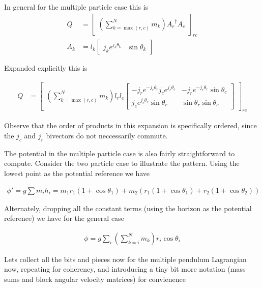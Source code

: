 In general for the multiple particle case this is
\begin{align}\label{eqn:sPolarMultiPendulum:zoo16}
Q &=
{\begin{bmatrix}
\left(\sum_{k=\max(r,c)}^N m_k \right)
{A_r}^\dagger A_c
\end{bmatrix}}_{rc} \\
A_k &= l_k 
\begin{bmatrix}
j_k e^{j_k \theta_k} & \sin\theta_k
\end{bmatrix}
\end{align}

Expanded explicitly this is

\begin{align}\label{eqn:sPolarMultiPendulum:zoo17}
Q &=
{\begin{bmatrix}
\left(\sum_{k=\max(r,c)}^N m_k \right) l_r l_c
\begin{bmatrix}
- j_r e^{-j_r \theta_r} j_c e^{j_c\theta_c} & - j_r e^{-j_r \theta_r} \sin\theta_c \\
j_c e^{j_c \theta_c} \sin\theta_r & \sin\theta_r \sin\theta_c
\end{bmatrix}
\end{bmatrix}}_{rc}
\end{align}

Observe that the order of products in this expansion is specifically ordered, since the $j_c$ and $j_r$ bivectors do not neccessarily commute.

The potential in the multiple particle case is also fairly straightforward to compute.  Consider the two particle case to illustrate the pattern.   Using the lowest point as the potential reference we have

\begin{align}\label{eqn:sPolarMultiPendulum:zoo18}
\phi' = g \sum m_i h_i
= m_1 r_1 (1 + \cos\theta_1) 
+ m_2 \left( r_1(1 + \cos\theta_1) + r_2( 1 + \cos\theta_2) \right)
\end{align}

Alternately, dropping all the constant terms (using the horizon as the potential reference) we have for the general case

\begin{align}\label{eqn:sPolarMultiPendulum:zoo19}
\phi = g \sum_i \left( \sum_{k=i}^N m_k \right) r_i \cos\theta_i
\end{align}

Lets collect all the bits and pieces now for the multiple pendulum Lagrangian now, repeating for coherency, and introducing a tiny bit more notation (mass sums and block angular velocity matrices) for convienence

